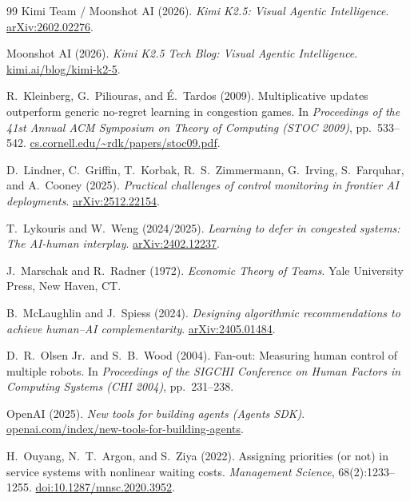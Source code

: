 \documentclass[11pt,reqno]{amsart}
\theoremstyle{spacious}
\begin{document}
\begin{thebibliography}{99}
Kimi Team / Moonshot AI (2026). \emph{Kimi K2.5: Visual Agentic Intelligence}. \href{https://arxiv.org/abs/2602.02276}{arXiv:2602.02276}.

Moonshot AI (2026). \emph{Kimi K2.5 Tech Blog: Visual Agentic Intelligence}. \href{https://www.kimi.ai/blog/kimi-k2-5}{kimi.ai/blog/kimi-k2-5}.

R.~Kleinberg, G.~Piliouras, and \'E.~Tardos (2009). Multiplicative updates outperform generic no-regret learning in congestion games. In \emph{Proceedings of the 41st Annual ACM Symposium on Theory of Computing (STOC 2009)}, pp.~533--542. \href{https://www.cs.cornell.edu/~rdk/papers/stoc09.pdf}{cs.cornell.edu/\~{}rdk/papers/stoc09.pdf}.

D.~Lindner, C.~Griffin, T.~Korbak, R.~S.~Zimmermann, G.~Irving, S.~Farquhar, and A.~Cooney (2025). \emph{Practical challenges of control monitoring in frontier AI deployments}. \href{https://arxiv.org/abs/2512.22154}{arXiv:2512.22154}.

T.~Lykouris and W.~Weng (2024/2025). \emph{Learning to defer in congested systems: The AI-human interplay}. \href{https://arxiv.org/abs/2402.12237}{arXiv:2402.12237}.

J.~Marschak and R.~Radner (1972). \emph{Economic Theory of Teams}. Yale University Press, New Haven, CT.

B.~McLaughlin and J.~Spiess (2024). \emph{Designing algorithmic recommendations to achieve human--AI complementarity}. \href{https://arxiv.org/abs/2405.01484}{arXiv:2405.01484}.

D.~R.~Olsen Jr.\ and S.~B.~Wood (2004). Fan-out: Measuring human control of multiple robots. In \emph{Proceedings of the SIGCHI Conference on Human Factors in Computing Systems (CHI 2004)}, pp.~231--238.

OpenAI (2025). \emph{New tools for building agents (Agents SDK)}. \href{https://openai.com/index/new-tools-for-building-agents/}{openai.com/index/new-tools-for-building-agents}.

H.~Ouyang, N.~T.~Argon, and S.~Ziya (2022). Assigning priorities (or not) in service systems with nonlinear waiting costs. \emph{Management Science}, 68(2):1233--1255. \href{https://pubsonline.informs.org/doi/10.1287/mnsc.2020.3952}{doi:10.1287/mnsc.2020.3952}.


\end{thebibliography}
\end{document}
